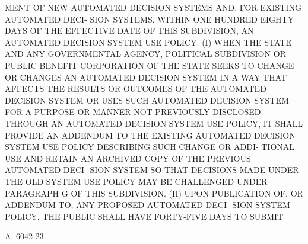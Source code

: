  MENT OF NEW AUTOMATED DECISION SYSTEMS AND, FOR EXISTING AUTOMATED DECI-
 SION SYSTEMS, WITHIN ONE HUNDRED EIGHTY DAYS OF THE  EFFECTIVE  DATE  OF
 THIS SUBDIVISION, AN AUTOMATED DECISION SYSTEM USE POLICY.
   (I)  WHEN THE STATE AND ANY GOVERNMENTAL AGENCY, POLITICAL SUBDIVISION
 OR PUBLIC BENEFIT CORPORATION OF THE STATE SEEKS TO CHANGE OR CHANGES AN
 AUTOMATED DECISION SYSTEM IN A WAY THAT AFFECTS THE RESULTS OR  OUTCOMES
 OF  THE AUTOMATED DECISION SYSTEM OR USES SUCH AUTOMATED DECISION SYSTEM
 FOR A PURPOSE OR MANNER NOT PREVIOUSLY DISCLOSED  THROUGH  AN  AUTOMATED
 DECISION SYSTEM USE POLICY, IT SHALL PROVIDE AN ADDENDUM TO THE EXISTING
 AUTOMATED  DECISION  SYSTEM  USE  POLICY DESCRIBING SUCH CHANGE OR ADDI-
 TIONAL USE AND RETAIN AN ARCHIVED COPY OF THE PREVIOUS  AUTOMATED  DECI-
 SION  SYSTEM  SO THAT DECISIONS MADE UNDER THE OLD SYSTEM USE POLICY MAY
 BE CHALLENGED UNDER PARAGRAPH G OF THIS SUBDIVISION.
   (II) UPON PUBLICATION OF, OR ADDENDUM TO, ANY PROPOSED AUTOMATED DECI-
 SION SYSTEM POLICY, THE PUBLIC SHALL  HAVE  FORTY-FIVE  DAYS  TO  SUBMIT

 A. 6042                            23
 
